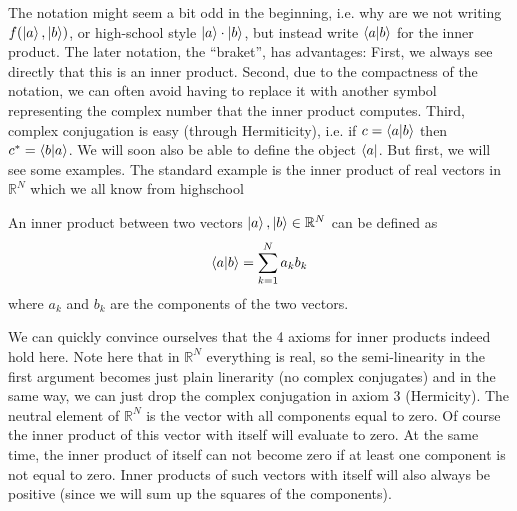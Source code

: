 The notation might seem a bit odd in the beginning, i.e. why are we not writing $f(\ket{a},\ket{b})$, or high-school style $\ket{a}\cdot \ket{b}$, but instead write $\braket{a}{b}$ for the inner product. The later notation, the ``braket'', has advantages: First, we always see directly that this is an inner product. Second, due to the compactness of the notation, we can often avoid having to replace it with another symbol representing the complex number that the inner product computes. Third, complex conjugation is easy (through Hermiticity), i.e. if $c=\braket{a}{b}$ then $c^* = \braket{b}{a}$. We will soon also be able to define the object $\bra{a}$. But first, we will see some examples.
The standard example is the inner product of real vectors in $\mathbb{R}^N$ which we all know from highschool
\begin{ex*} An inner product between two  vectors $\ket{a},\ket{b} \in \mathbb{R}^N$ can be defined as
\begin{align*}
    \braket{a}{b} = \sum_{k=1}^N a_k b_k
\end{align*}
where $a_k$ and $b_k$ are the components of the two vectors.
\end{ex*}
We can quickly convince ourselves that the 4 axioms for inner products indeed hold here. Note here that in $\mathbb{R}^N$ everything is real, so the semi-linearity in the first argument becomes just plain linerarity (no complex conjugates) and in the same way, we can just drop the complex conjugation in axiom 3 (Hermicity).
The neutral element of $\mathbb{R}^N$ is the vector with all components equal to zero. Of course the inner product of this vector with itself will evaluate to zero. At the same time, the inner product of itself can not become zero if at least one component is not equal to zero. Inner products of such vectors with itself will also always be positive (since we will sum up the squares of the components).

